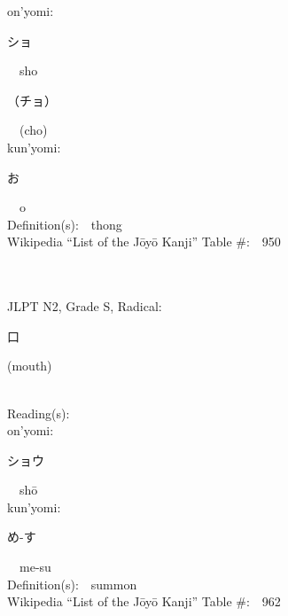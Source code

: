 \begin{multicols}{2}
{\hspace*{1em}}on'yomi:\ \ \\
{\hspace*{2em}}{\begin{CJK}{UTF8}{min} ショ \end{CJK}}\ \ sho\ \ \\
{\hspace*{2em}}{\begin{CJK}{UTF8}{min} （チョ） \end{CJK}}\ \ (cho)\ \ \\
{\hspace*{1em}}kun'yomi:\ \ \\
{\hspace*{2em}}{\begin{CJK}{UTF8}{min} お \end{CJK}}\ \ o\ \ \\
Definition(s):\ \ thong \\
Wikipedia ``List of the J\=oy\=o Kanji'' Table \#:\ \ 950 \\
\ \ \\
{\fontsize{34pt}{40pt}  }\ \ \\  %
{JLPT N2, Grade S, Radical:\ \ {\begin{CJK}{UTF8}{min} 口 \end{CJK}} (mouth) } \\
Reading(s):\ \ \\
{\hspace*{1em}}on'yomi:\ \ \\
{\hspace*{2em}}{\begin{CJK}{UTF8}{min} ショウ \end{CJK}}\ \ sh\=o\ \ \\
{\hspace*{1em}}kun'yomi:\ \ \\
{\hspace*{2em}}{\begin{CJK}{UTF8}{min} め-す \end{CJK}}\ \ me-su\ \ \\
Definition(s):\ \ summon \\
Wikipedia ``List of the J\=oy\=o Kanji'' Table \#:\ \ 962 \\
\ \ \\
{\fontsize{34pt}{40pt}  }\ \ \\  %

\end{multicols}

